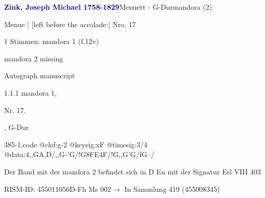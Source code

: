 \documentclass[twocolumn, 12pt]{book}
\begin{document}
\par \vspace{16pt} \textcolor{darkblue}{\textbf{Zink, Joseph Michael  1758-1829}}\hfillplus{\textbf{[385]}}\newline Menuett - G-Dur\newline mandora (2)
\par \begin{itshape}[f.12v, at left:] Menue | [left before the accolade:] Nro. 17\end{itshape} 
\par \textcolor{darkblue}{}  1 Stimmen: mandora 1  (f.12v)\newline \begin{small} mandora 2 missing\end{small} \newline Autograph manuscript
\par 1.1.1  mandora 1, \begin{itshape}Nr. 17.\end{itshape}, G-Dur  
\begin{filecontents*}{385-1.code}
@clef:g-2
@keysig:xF
@timesig:3/4
@data:4,,GA,D/,,G-'G/!G{8FE}4F/!G,,G'G/fG--/
\end{filecontents*}
\newline %
\par Der Band mit der mandora 2 befindet sich in D Eu mit der Signatur Esl VIII 403
\par RISM-ID: 455011056\newline D-Fh  Ms 002\newline $\rightarrow$ In Sammlung 419 (455008345)
      
\end{document}
